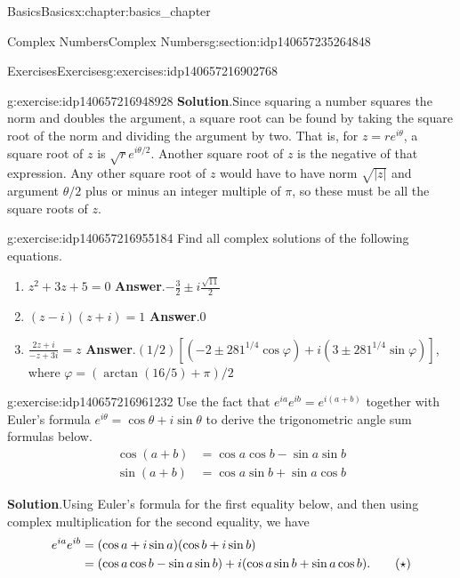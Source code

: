\documentclass[oneside,10pt,]{book}
\numberwithin{equation}{section}
\newcommand{\amp}{&}
\begin{document}
\begin{chapterptx}{Basics}{}{Basics}{}{}{x:chapter:basics_chapter}
\begin{sectionptx}{Complex Numbers}{}{Complex Numbers}{}{}{g:section:idp140657235264848}
\begin{exercises-subsection}{Exercises}{}{Exercises}{}{}{g:exercises:idp140657216902768}
\begin{divisionexercise}{8}{}{}{g:exercise:idp140657216948928}
\noindent\textbf{Solution}.\hypertarget{g:solution:idp140657216950528}{}\quad{}Since squaring a number squares the norm and doubles the argument, a square root can be found by taking the square root of the norm and dividing the argument by two.  That is, for \(z=re^{i\theta}\), a square root of \(z\) is \(\sqrt{r}e^{i\theta/2}\).  Another square root of \(z\) is the negative of that expression.  Any other square root of \(z\) would have to have norm \(\sqrt{|z|}\) and argument \(\theta/2\) plus or minus an integer multiple of \(\pi\), so these must be all the square roots of \(z\).\end{divisionexercise}%
\begin{divisionexercise}{9}{}{}{g:exercise:idp140657216955184}%
Find all complex solutions of the following equations. %
\begin{enumerate}[label=(\alph*)]
\item{}\(\displaystyle z^2 + 3z + 5 = 0\) \textbf{Answer}.\quad{}\(\displaystyle -\frac{3}{2} \pm i\frac{\sqrt{11}}{2}\)%
\item{}\((z - i)(z + i) = 1\) \textbf{Answer}.\quad{}\(0\)%
\item{}\(\displaystyle \frac{2z + i}{-z+3i} = z\) \textbf{Answer}.\quad{}\(\displaystyle (1/2)[(-2 \pm 281^{1/4}\cos \varphi) + i(3 \pm
281^{1/4}\sin \varphi)]\), where \(\varphi=(\arctan(16/5)+\pi)/2\)%
\end{enumerate}
\end{divisionexercise}%
\begin{divisionexercise}{10}{}{}{g:exercise:idp140657216961232}%
Use the fact that \(e^{ia}e^{ib}=e^{i(a+b)}\) together with Euler's formula \(e^{i\theta}=\cos\theta + i\sin\theta\) to derive the trigonometric angle sum formulas below.%
\begin{align*}
\cos(a+b) \amp = \cos a \cos b -\sin a \sin b\\
\sin(a+b) \amp = \cos a \sin b + \sin a \cos b
\end{align*}
\par\smallskip%
\noindent\textbf{Solution}.\hypertarget{g:solution:idp140657216964240}{}\quad{}Using Euler's formula for the first equality below, and then using complex multiplication for the second equality, we have%
\begin{align}
e^{ia}e^{ib} \amp = (\cos a + i\sin a)(\cos b + i\sin b)\notag\\
\amp = (\cos a\cos b - \sin a \sin b) + i(\cos a \sin b + \sin a\cos b).\tag{\(\star\)}\label{x:mrow:localtag1}
\end{align}

\end{divisionexercise}
\end{exercises-subsection}
\end{sectionptx}
\end{chapterptx}
\end{document}
